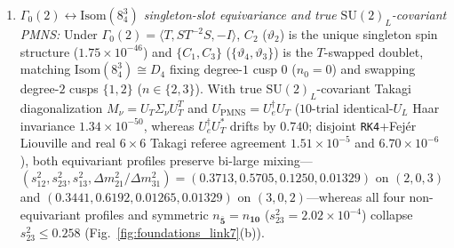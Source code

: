 \documentclass[aps,prd,twocolumn,nofootinbib,floatfix]{revtex4-2}
\begin{document}
\begin{enumerate}
    \begin{align}
    \label{eq:spin10_d5_intersection}
    \dim\mathrm{Cent}_{\mathfrak{so}(10)}(P_{10}) &= 21 \ (\mathfrak{g}_{\mathrm{PS}}), \nonumber\\
    \dim\mathrm{Cent}_{\mathfrak{so}(10)}(J_{10}) &= 25 \ (\mathfrak{u}(5)), \nonumber\\
    \dim\bigl[\mathrm{Cent}_{\mathfrak{so}(10)}(P_{10}) \cap \mathfrak{su}(5)\bigr] &= 12 \ (\mathfrak{g}_{\mathrm{SM}}).
    \end{align}
    On $\Lambda^{\mathrm{even}}(W_5) = \mathbf{16}_+$, $P_{\mathrm{wedge}} = (-1)^{2I_3}$ splits $(\mathbf{4},\mathbf{2}_L,\mathbf{1})_- \oplus (\bar{\mathbf{4}},\mathbf{1},\mathbf{2}_R)_+$ ($8 + 8$), while on $\mathbf{10}_H = \mathbf{5}\oplus\overline{\mathbf{5}}$ the Kawamura parity $+P_5 = +1$ (priced at $1$ discrete sign bit, since $-P_5 = +1$ retains the $6$ color triplets) keeps the $4$ electroweak doublet states $(H_u, H_d)$ ($6Y = \pm 3$), filters the $40$ $\mathrm{Spin}(10)$-invariant $\mathbf{10}_H\cdot\mathbf{16}\cdot\mathbf{16}$ trilinears down to the exact $16$ Standard Model Yukawas ($6\,Q u^c + 6\,Q d^c + 2\,L e^c + 2\,L\nu^c$, eliminating all $24$ color-triplet operators), and pairs with Schur's Lemma $\dim_{\mathbb{C}}\mathrm{Hom}_{S_3}(\mathbf{2}_{\mathrm{std}}, M_2(\Gamma(2))) = 1$ ($M_2(\Gamma(2)) = \mathrm{span}(\vartheta_2^4, \vartheta_4^4)$ verified symbolically and at $45$ digits) to force $H_u$ and $H_d$ in Frame~C to share the unique modular Higgs profile $S(\tau)$. Under mirror conjugation $\tau_8^+ \mapsto -\bar{\tau}_8^+$ with $(a,b)\mapsto(-a,b)$, $|\varepsilon_1(\tau_8^+) + \varepsilon_1(-\bar{\tau}_8^+)| = 4.98\times 10^{-54}$ (with $Y_B(\tau_8^+) < 0 < Y_B(-\bar{\tau}_8^+)$, fixing $-\bar{\tau}_8^+ = (-16+8i)/5$ in positive baryon convention) and $|(J_{\mathrm{CKM}}/Y_B)_{\tau_8^+} - (J_{\mathrm{CKM}}/Y_B)_{-\bar{\tau}_8^+}| = 1.11\times 10^{-76}$, locking the relative Jarlskog-to-baryon sign across mirror vacua.
    \item \emph{$\Gamma_0(2)\leftrightarrow\mathrm{Isom}(8^3_4)$ singleton-slot equivariance and true $\mathrm{SU}(2)_L$-covariant PMNS:} Under $\Gamma_0(2) = \langle T, ST^{-2}S, -I\rangle$, $C_2$ ($\vartheta_2$) is the unique singleton spin structure ($1.75\times 10^{-46}$) and $\{C_1, C_3\}$ ($\{\vartheta_4, \vartheta_3\}$) is the $T$-swapped doublet, matching $\mathrm{Isom}(8^3_4) \cong D_4$ fixing degree-$1$ cusp $0$ ($n_0 = 0$) and swapping degree-$2$ cusps $\{1,2\}$ ($n \in \{2,3\}$). With true $\mathrm{SU}(2)_L$-covariant Takagi diagonalization $M_\nu = U_T\Sigma_\nu U_T^T$ and $U_{\mathrm{PMNS}} = U_e^\dagger U_T$ ($10$-trial identical-$U_L$ Haar invariance $1.34\times 10^{-50}$, whereas $U_e^\dagger U_T^*$ drifts by $0.740$; disjoint \texttt{RK4}+Fej\'er Liouville and real $6\times 6$ Takagi referee agreement $1.51\times 10^{-5}$ and $6.70\times 10^{-6}$), both equivariant profiles preserve bi-large mixing---$(s_{12}^2, s_{23}^2, s_{13}^2, \Delta m_{21}^2/\Delta m_{31}^2) = (0.3713, 0.5705, 0.1250, 0.01329)$ on $(2,0,3)$ and $(0.3441, 0.6192, 0.01265, 0.01329)$ on $(3,0,2)$---whereas all four non-equivariant profiles and symmetric $n_{\bar{\mathbf{5}}} = n_{\mathbf{10}}$ ($s_{23}^2 = 2.02\times 10^{-4}$) collapse $s_{23}^2 \le 0.258$ (Fig.~\ref{fig:foundations_link7}(b)).

\end{enumerate}
\end{document}
